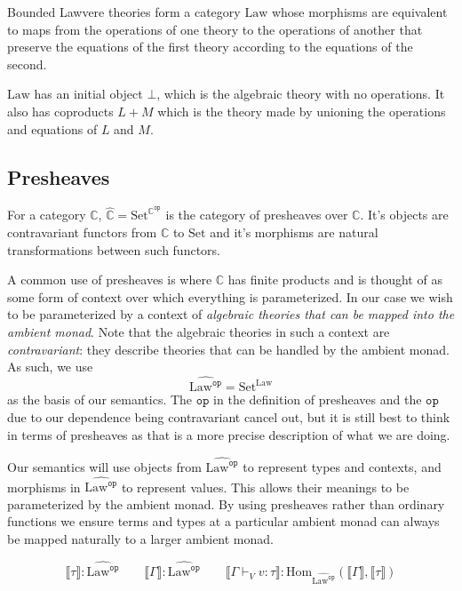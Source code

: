 \documentclass[acmsmall, screen, nonacm]{acmart}
\theoremstyle{definition}
\newcommand{\cat}{\mathbb{C}}
\newcommand{\op}{\mathtt{op}}
\newcommand{\catop}{\cat^{\op}}
\newcommand{\setc}{\mathrm{Set}}
\newcommand{\psh}{\widehat{\cat}}
\newcommand{\initial}{\bot}
\newcommand{\lawc}{\mathrm{Law}}
\newcommand{\lawcop}{\lawc^{\mathtt{op}}}
\newcommand{\pshlawcop}{\widehat{\lawcop}}
\newcommand{\homset}[3]{\mathrm{Hom}_{#1}(#2, #3)}
\newcommand{\sem}[1]{\llbracket #1 \rrbracket}
\newcommand{\types}{\mathrel{:}}
\newcommand{\turnv}{\mathrel{\vdash_V}}
\begin{document}
Bounded Lawvere theories form a category $\lawc$ whose morphisms are
equivalent to maps from the operations of one theory to the operations
of another that preserve the equations of the first theory according to
the equations of the second.

$\lawc$ has an initial object $\initial$, which is the algebraic theory
with no operations. It also has coproducts $L + M$ which is the theory
made by unioning the operations and equations of $L$ and $M$.

\subsection{Presheaves}

For a category $\cat$, $\psh = \setc^{\catop}$ is the category of
presheaves over $\cat$. It's objects are contravariant functors from
$\cat$ to $\setc$ and it's morphisms are natural transformations between
such functors.

A common use of presheaves is where $\cat$ has finite products and is
thought of as some form of context over which everything is
parameterized. In our case we wish to be parameterized by a context of
\emph{algebraic theories that can be mapped into the ambient
  monad}. Note that the algebraic theories in such a context are
\emph{contravariant}: they describe theories that can be handled by the
ambient monad. As such, we use
\begin{equation*}
  \pshlawcop = \setc^{\lawc}
\end{equation*}
as the basis of our semantics. The $\op$ in the definition of presheaves
and the $\op$ due to our dependence being contravariant cancel out, but
it is still best to think in terms of presheaves as that is a more
precise description of what we are doing.

Our semantics will use objects from $\pshlawcop$ to represent types and
contexts, and morphisms in $\pshlawcop$ to represent values. This allows
their meanings to be parameterized by the ambient monad. By using
presheaves rather than ordinary functions we ensure terms and types at a
particular ambient monad can always be mapped naturally to a larger
ambient monad.

\begin{equation*}
\sem{\tau} \mathrel{:} \pshlawcop \qquad
\sem{\Gamma} \mathrel{:} \pshlawcop \qquad
\sem{\Gamma \turnv v \types \tau} \mathrel{:} \homset{\pshlawcop}{\sem{\Gamma}}{\sem{\tau}}
\end{equation*}
\end{document}
